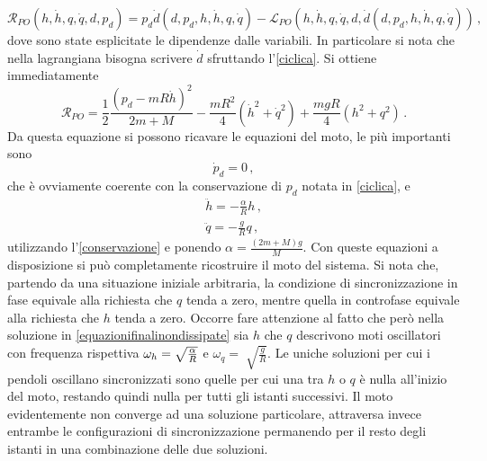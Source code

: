 \documentclass[11pt, a4paper, twoside, italian]{article}
\begin{document}
\begin{equation*}
\mathcal{R}_{PO}(h,\dot h, q, \dot q, d, p_d )  = 
p_d \dot{d}(d, p_d, h,\dot h, q, \dot q)- \mathcal{L}_{PO}(h,\dot h, q, \dot q, d, \dot{d}(d, p_d, h,\dot h, q, \dot q)) \, ,
\end{equation*}
dove sono state esplicitate le dipendenze dalle variabili. 
In particolare si nota che nella lagrangiana bisogna scrivere $\dot d$ sfruttando l'\cref{ciclica}.
Si ottiene immediatamente 
\begin{equation*}
  \mathcal{R}_{PO} = \frac{1}{2} \frac{(p_d -mR\dot h)^2}{2m + M}- \frac{mR^2}{4}  (\dot{h}^2 + \dot{q}^2) + \frac{mgR}{4}(h^2 + q^2) \, .
\end{equation*}
Da questa equazione si possono ricavare le equazioni del moto, le più importanti sono 
\begin{equation}
  \dot p_d = 0 \, ,
  \label{conservazione}
\end{equation}
che è ovviamente coerente con la conservazione di $p_d$ notata in \cref{ciclica}, e
\begin{equation}
  \begin{split}
  \ddot h = -\frac{\alpha}{R} h \, ,\\
  \ddot q = - \frac{g}{R} q \, ,
  \end{split}
  \label{equazionifinalinondissipate}
\end{equation}
utilizzando l'\cref{conservazione} e ponendo $\alpha = \frac{(2m + M) g}{M} $.
Con queste equazioni a disposizione si può completamente ricostruire il moto del sistema.
Si nota che, partendo da una situazione iniziale arbitraria,
la condizione di sincronizzazione in fase equivale alla richiesta che $q$ tenda a zero, mentre quella in controfase
equivale alla richiesta che $h$ tenda a zero. 
Occorre fare attenzione al fatto che però nella soluzione in \cref{equazionifinalinondissipate} sia $h$ che $q$ descrivono moti oscillatori con frequenza rispettiva
$\omega_h = \sqrt{\frac{\alpha}{R} \vphantom{\frac{g}{R}}}$ e $\omega_q = \sqrt[]{\frac{g}{R}}$.
Le uniche soluzioni per cui i pendoli oscillano sincronizzati sono quelle per cui una tra $h$ o $q$ è nulla
all'inizio del moto, restando quindi nulla per tutti gli istanti successivi.
Il moto evidentemente non converge ad una soluzione particolare, attraversa invece entrambe le configurazioni di sincronizzazione 
permanendo per il resto degli istanti in una combinazione delle due soluzioni.
\label{sezionesenzaattrito}
\end{document}
